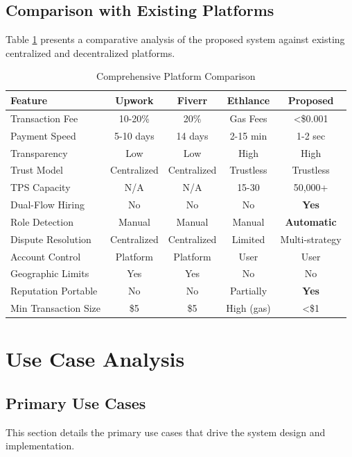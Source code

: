 \documentclass[a4paper,13pt,twoside]{report}
\theoremstyle{definition}
\begin{document}
\subsection{Comparison with Existing Platforms}

Table \ref{tab:platform_comparison} presents a comparative analysis of the proposed system against existing centralized and decentralized platforms.

\begin{table}[h]
\centering
\caption{Comprehensive Platform Comparison}
\label{tab:platform_comparison}
\small
\begin{tabular}{|l|c|c|c|c|}
\hline
\textbf{Feature} & \textbf{Upwork} & \textbf{Fiverr} & \textbf{Ethlance} & \textbf{Proposed} \\
\hline
Transaction Fee & 10-20\% & 20\% & Gas Fees & <\$0.001 \\
Payment Speed & 5-10 days & 14 days & 2-15 min & 1-2 sec \\
Transparency & Low & Low & High & High \\
Trust Model & Centralized & Centralized & Trustless & Trustless \\
TPS Capacity & N/A & N/A & 15-30 & 50,000+ \\
Dual-Flow Hiring & No & No & No & \textbf{Yes} \\
Role Detection & Manual & Manual & Manual & \textbf{Automatic} \\
Dispute Resolution & Centralized & Centralized & Limited & Multi-strategy \\
Account Control & Platform & Platform & User & User \\
Geographic Limits & Yes & Yes & No & No \\
Reputation Portable & No & No & Partially & \textbf{Yes} \\
Min Transaction Size & \$5 & \$5 & High (gas) & <\$1 \\
\hline
\end{tabular}
\end{table}

\section{Use Case Analysis}

\subsection{Primary Use Cases}

This section details the primary use cases that drive the system design and implementation.
\end{document}
